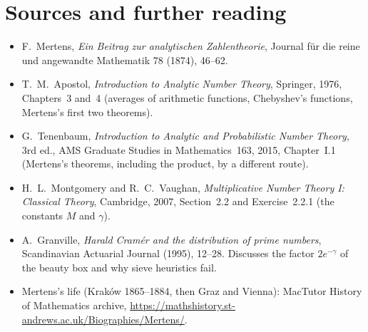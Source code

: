 \section*{Sources and further reading}

\begin{itemize}
\item F.~Mertens, \emph{Ein Beitrag zur analytischen Zahlentheorie}, Journal f\"ur die reine und angewandte Mathematik 78 (1874), 46--62.
\item T.~M.~Apostol, \emph{Introduction to Analytic Number Theory}, Springer, 1976, Chapters~3 and~4 (averages of arithmetic functions,
Chebyshev's functions, Mertens's first two theorems).
\item G.~Tenenbaum, \emph{Introduction to Analytic and Probabilistic Number Theory}, 3rd ed., AMS Graduate Studies in Mathematics~163, 2015,
Chapter~I.1 (Mertens's theorems, including the product, by a different route).
\item H.~L.~Montgomery and R.~C.~Vaughan, \emph{Multiplicative Number Theory I: Classical Theory}, Cambridge, 2007, Section~2.2 and
Exercise~2.2.1 (the constants $M$ and $\gamma$).
\item A.~Granville, \emph{Harald Cram\'er and the distribution of prime numbers}, Scandinavian Actuarial Journal (1995), 12--28. Discusses the factor
$2e^{-\gamma}$ of the beauty box and why sieve heuristics fail.
\item Mertens's life (Krak\'ow 1865--1884, then Graz and Vienna): MacTutor History of Mathematics archive, \url{https://mathshistory.st-andrews.ac.uk/Biographies/Mertens/}.
\end{itemize}
